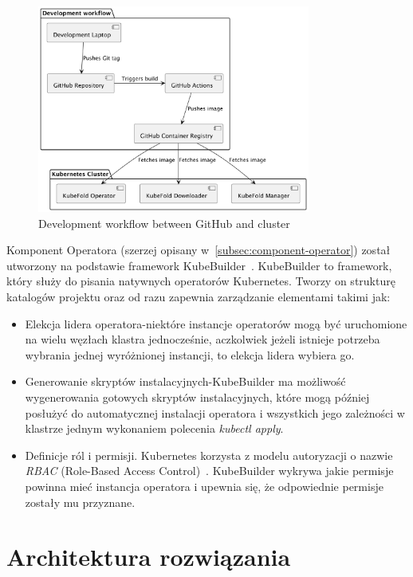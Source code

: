 \begin{figure}[htbp]
    \centering
    \includegraphics[width=0.8\textwidth]{images/images}
    \caption{Development workflow between GitHub and cluster}
    \label{fig:docker-images-flow}
\end{figure}

Komponent Operatora (szerzej opisany w~\ref{subsec:component-operator}) został utworzony na podstawie framework KubeBuilder~\cite{kubebuilder}.
KubeBuilder to framework, który służy do pisania natywnych operatorów Kubernetes.
Tworzy on strukturę katalogów projektu oraz od razu zapewnia zarządzanie elementami takimi jak:
\begin{itemize}
    \item Elekcja lidera operatora-niektóre instancje operatorów mogą być uruchomione na wielu węzłach klastra jednocześnie, aczkolwiek jeżeli istnieje potrzeba wybrania jednej wyróżnionej instancji, to elekcja lidera wybiera go.
    \item Generowanie skryptów instalacyjnych-KubeBuilder ma możliwość wygenerowania gotowych skryptów instalacyjnych, które mogą później posłużyć do automatycznej instalacji operatora i wszystkich jego zależności w klastrze jednym wykonaniem polecenia \textit{kubectl apply}.
    \item Definicje ról i permisji.
    Kubernetes korzysta z modelu autoryzacji o nazwie \textit{RBAC} (Role-Based Access Control)~\cite{k8s_rbac}.
    KubeBuilder wykrywa jakie permisje powinna mieć instancja operatora i upewnia się, że odpowiednie permisje zostały mu przyznane.
\end{itemize}


\section{Architektura rozwiązania}

